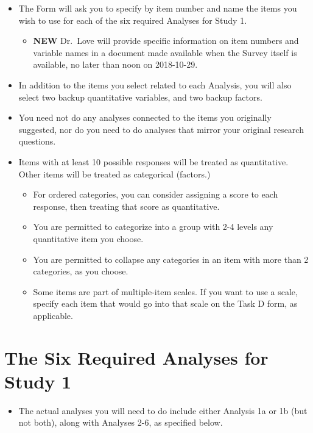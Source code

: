 \documentclass[]{book}
\providecommand{\tightlist}{%
  \setlength{\itemsep}{0pt}\setlength{\parskip}{0pt}}
\theoremstyle{definition}
\theoremstyle{definition}
\theoremstyle{definition}
\theoremstyle{remark}
\begin{document}
\begin{itemize}
\tightlist
\item
  The Form will ask you to specify by item number and name the items you
  wish to use for each of the six required Analyses for Study 1.

  \begin{itemize}
  \tightlist
  \item
    \textbf{NEW} Dr.~Love will provide specific information on item
    numbers and variable names in a document made available when the
    Survey itself is available, no later than noon on 2018-10-29.
  \end{itemize}
\item
  In addition to the items you select related to each Analysis, you will
  also select two backup quantitative variables, and two backup factors.
\item
  You need not do any analyses connected to the items you originally
  suggested, nor do you need to do analyses that mirror your original
  research questions.
\item
  Items with at least 10 possible responses will be treated as
  quantitative. Other items will be treated as categorical (factors.)

  \begin{itemize}
  \tightlist
  \item
    For ordered categories, you can consider assigning a score to each
    response, then treating that score as quantitative.
  \item
    You are permitted to categorize into a group with 2-4 levels any
    quantitative item you choose.
  \item
    You are permitted to collapse any categories in an item with more
    than 2 categories, as you choose.
  \item
    Some items are part of multiple-item scales. If you want to use a
    scale, specify each item that would go into that scale on the Task D
    form, as applicable.
  \end{itemize}
\end{itemize}

\hypertarget{the-six-required-analyses-for-study-1}{%
\section{The Six Required Analyses for Study
1}\label{the-six-required-analyses-for-study-1}}

\begin{itemize}
\tightlist
\item
  The actual analyses you will need to do include either Analysis 1a or
  1b (but not both), along with Analyses 2-6, as specified below.
\end{itemize}
\end{document}

